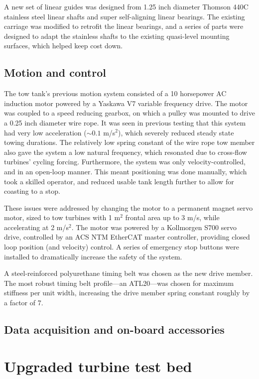 A new set of linear guides was designed from 1.25 inch diameter Thomson 440C
stainless steel linear shafts and super self-aligning linear bearings. The
existing carriage was modified to retrofit the linear bearings, and a series of
parts were designed to adapt the stainless shafts to the existing quasi-level
mounting surfaces, which helped keep cost down.

\subsection{Motion and control}

The tow tank's previous motion system consisted of a 10 horsepower AC induction
motor powered by a Yaskawa V7 variable frequency drive. The motor was coupled to
a speed reducing gearbox, on which a pulley was mounted to drive a 0.25 inch
diameter wire rope. It was seen in previous testing that this system had very
low acceleration ($\sim 0.1$ m/s$^2$), which severely reduced steady state
towing durations. The relatively low spring constant of the wire rope tow member
also gave the system a low natural frequency, which resonated due to cross-flow
turbines' cycling forcing. Furthermore, the system was only velocity-controlled,
and in an open-loop manner. This meant positioning was done manually, which took
a skilled operator, and reduced usable tank length further to allow for
coasting to a stop.

These issues were addressed by changing the motor to a permanent magnet servo
motor, sized to tow turbines with 1 m$^2$ frontal area up to 3 m/s, while
accelerating at 2 m/s$^2$. The motor was powered by a Kollmorgen S700 servo
drive, controlled by an ACS NTM EtherCAT master controller, providing closed
loop position (and velocity) control. A series of emergency stop buttons were
installed to dramatically increase the safety of the system.

A steel-reinforced polyurethane timing belt was chosen as the new drive member.
The most robust timing belt profile---an ATL20---was chosen for maximum
stiffness per unit width, increasing the drive member spring constant roughly by a
factor of 7.

\subsection{Data acquisition and on-board accessories}


\section{Upgraded turbine test bed}


